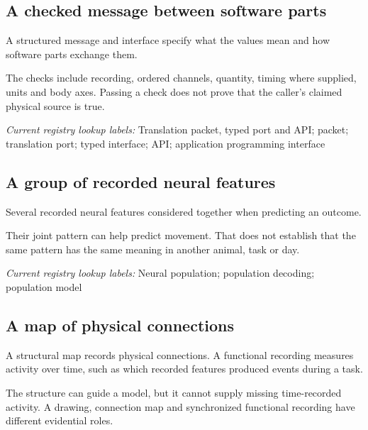 \begin{samepage}
\subsection*{A checked message between software parts}
\noindent A structured message and interface specify what the values mean and how software parts exchange them.\par
\end{samepage}
\begin{samepage}
\noindent The checks include recording, ordered channels, quantity, timing where supplied, units and body axes. Passing a check does not prove that the caller’s claimed physical source is true.\par\nopagebreak[4]

\end{samepage}


\noindent\textit{Current registry lookup labels:} Translation packet, typed port and API; packet; translation port; typed interface; API; application programming interface\par

\begin{samepage}
\subsection*{A group of recorded neural features}
\noindent Several recorded neural features considered together when predicting an outcome.\par
\end{samepage}
\begin{samepage}
\noindent Their joint pattern can help predict movement. That does not establish that the same pattern has the same meaning in another animal, task or day.\par\nopagebreak[4]

\end{samepage}


\noindent\textit{Current registry lookup labels:} Neural population; population decoding; population model\par

\begin{samepage}
\subsection*{A map of physical connections}
\noindent A structural map records physical connections. A functional recording measures activity over time, such as which recorded features produced events during a task.\par
\end{samepage}
\begin{samepage}
\noindent The structure can guide a model, but it cannot supply missing time-recorded activity. A drawing, connection map and synchronized functional recording have different evidential roles.\par\nopagebreak[4]

\end{samepage}


